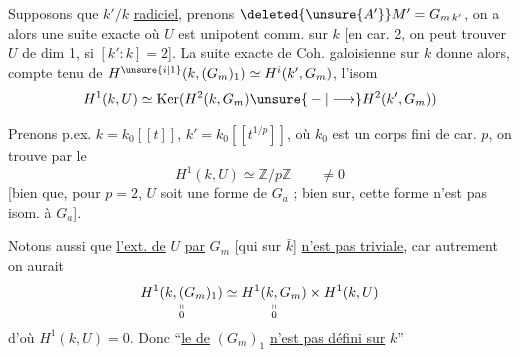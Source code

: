 Supposons que $k'/k$  \uline{radiciel}, prenons $\deleted{\unsure{A'}}M'=G_{m\,k'}$, on a alors une suite exacte
où $U$ est unipotent comm.  sur $k$ [en car. 2, on peut trouver $U$ de dim 1,  si $[k':k]=2$]. La suite exacte de Coh. galoisienne sur $k$ donne alors, compte tenu de $H^{\unsure{i|1}}(k,(G_m)_1)\simeq H^i(k',G_m)$, l'isom
\[
H^1(k,U)\simeq\operatorname{Ker}(H^2(k,G_m)\unsure{{}-{ }|\longrightarrow}H^2(k',G_m))
\]

Prenons p.ex. $k=k_0[[t]]$, $k'=k_0[[t^{1/p}]]$, où $k_0$ est un corps fini de car. $p$, on trouve par le 
\[
H^1(k,U)\simeq\mathbb{Z}/p\mathbb{Z}\qquad\ne0
\]
[bien que, pour $p=2$, $U$ soit une forme de $G_a$ ; bien sur, cette forme n'est pas isom. à $G_a$].

Notons aussi que \uline{l'ext. de} $U$ \uline{par} $G_m$ [qui  sur $\bar k$] \uline{n'est pas triviale}, car autrement on aurait
\[
\underset{\substack{\shortparallel\\0}}{H^1(k,(G_m)_1)}\simeq\underset{\substack{\shortparallel\\0}}{H^1(k,G_m)}\times H^1(k,U)
\]
d'où $H^1(k,U)=0$. Donc ``\uline{le   de} $(G_m)_1$ \uline{n'est pas défini sur} $k$''
